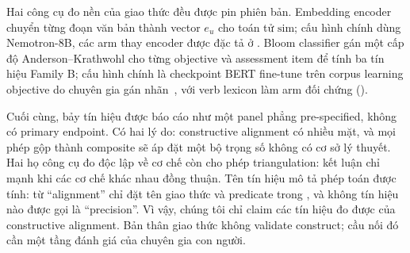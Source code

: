 Hai công cụ đo nền của giao thức đều được pin phiên bản. Embedding encoder
chuyển từng đoạn văn bản thành vector $e_u$ cho toán tử $\mathrm{sim}$; cấu
hình chính dùng Nemotron-8B, các arm thay encoder được đặc tả ở
. Bloom classifier gán một cấp độ Anderson--Krathwohl cho
từng objective và assessment item để tính ba tín hiệu Family B; cấu hình chính
là checkpoint BERT fine-tune trên corpus learning objective do chuyên gia gán
nhãn~\cite{li2022bloomclassification}, với verb lexicon làm arm đối chứng
().

Cuối cùng, bảy tín hiệu được báo cáo như một panel phẳng pre-specified, không
có primary endpoint. Có hai lý do: constructive alignment có nhiều mặt, và mọi
phép gộp thành composite sẽ áp đặt một bộ trọng số không có cơ sở lý thuyết.
Hai họ công cụ đo độc lập về cơ chế còn cho phép triangulation: kết luận chỉ
mạnh khi các cơ chế khác nhau đồng thuận. Tên tín hiệu mô tả phép toán được
tính: từ ``alignment'' chỉ đặt tên giao thức và predicate trong
, và không tín hiệu nào được gọi là ``precision''. Vì vậy,
chúng tôi chỉ claim các tín hiệu đo được của constructive alignment. Bản thân
giao thức không validate construct; cầu nối đó cần một tầng đánh giá của chuyên
gia con người.
